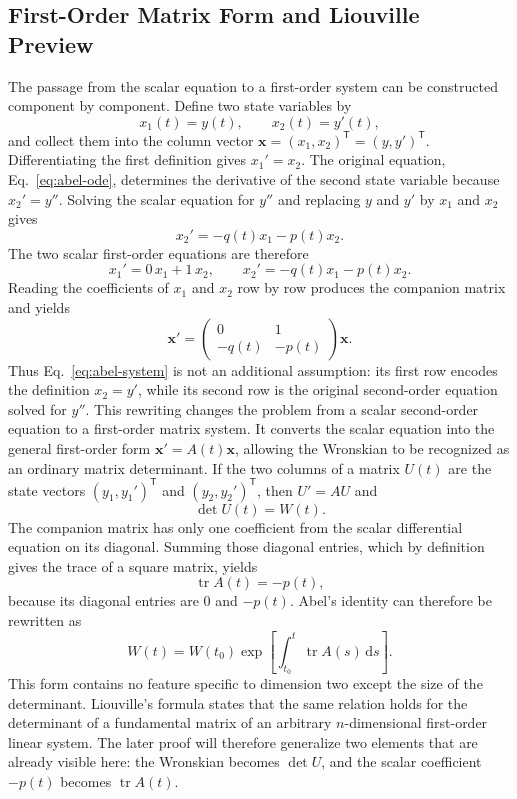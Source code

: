 \documentclass[11pt,a4paper]{article}
\newcommand{\be}{\begin{equation}}
\newcommand{\ee}{\end{equation}}
\newcommand{\lb}[1]{\label{#1}}
\newcommand{\dd}{\mathrm{d}}
\DeclareMathOperator{\tr}{tr}
\theoremstyle{definition}
\numberwithin{equation}{section}
\begin{document}
\subsection{First-Order Matrix Form and Liouville Preview}

The passage from the scalar equation to a first-order system can be constructed component by component. Define two state variables by
\begin{equation}
x_1(t)=y(t),
\qquad
x_2(t)=y'(t),
\end{equation}
and collect them into the column vector $\mathbf{x}=(x_1,x_2)^{\mathsf T}=(y,y')^{\mathsf T}$. Differentiating the first definition gives $x_1'=x_2$. The original equation, Eq.~\eqref{eq:abel-ode}, determines the derivative of the second state variable because $x_2'=y''$. Solving the scalar equation for $y''$ and replacing $y$ and $y'$ by $x_1$ and $x_2$ gives
\begin{equation}
x_2'=-q(t)x_1-p(t)x_2.
\end{equation}
The two scalar first-order equations are therefore
\begin{equation}
x_1'=0\,x_1+1\,x_2,
\qquad
x_2'=-q(t)x_1-p(t)x_2.
\end{equation}
Reading the coefficients of $x_1$ and $x_2$ row by row produces the companion matrix and yields
\be
\mathbf{x}'
=
\begin{pmatrix}
0 & 1\\
-q(t) & -p(t)
\end{pmatrix}
\mathbf{x}.
\lb{eq:abel-system}
\ee
Thus Eq.~\eqref{eq:abel-system} is not an additional assumption: its first row encodes the definition $x_2=y'$, while its second row is the original second-order equation solved for $y''$. This rewriting changes the problem from a scalar second-order equation to a first-order matrix system. It converts the scalar equation into the general first-order form $\mathbf{x}'=A(t)\mathbf{x}$, allowing the Wronskian to be recognized as an ordinary matrix determinant. If the two columns of a matrix $U(t)$ are the state vectors $(y_1,y_1')^{\mathsf T}$ and $(y_2,y_2')^{\mathsf T}$, then $U'=AU$ and
\be
\det U(t)=W(t).
\lb{eq:abel-det-U}
\ee
The companion matrix has only one coefficient from the scalar differential equation on its diagonal. Summing those diagonal entries, which by definition gives the trace of a square matrix, yields
\be
\tr A(t)=-p(t),
\lb{eq:abel-trace}
\ee
because its diagonal entries are $0$ and $-p(t)$. Abel's identity can therefore be rewritten as
\be
W(t)=W(t_0)
\exp\left[
\int_{t_0}^{t}\tr A(s)\,\dd s
\right].
\lb{eq:abel-matrix-preview}
\ee
This form contains no feature specific to dimension two except the size of the determinant. Liouville's formula states that the same relation holds for the determinant of a fundamental matrix of an arbitrary $n$-dimensional first-order linear system. The later proof will therefore generalize two elements that are already visible here: the Wronskian becomes $\det U$, and the scalar coefficient $-p(t)$ becomes $\tr A(t)$.
\end{document}
